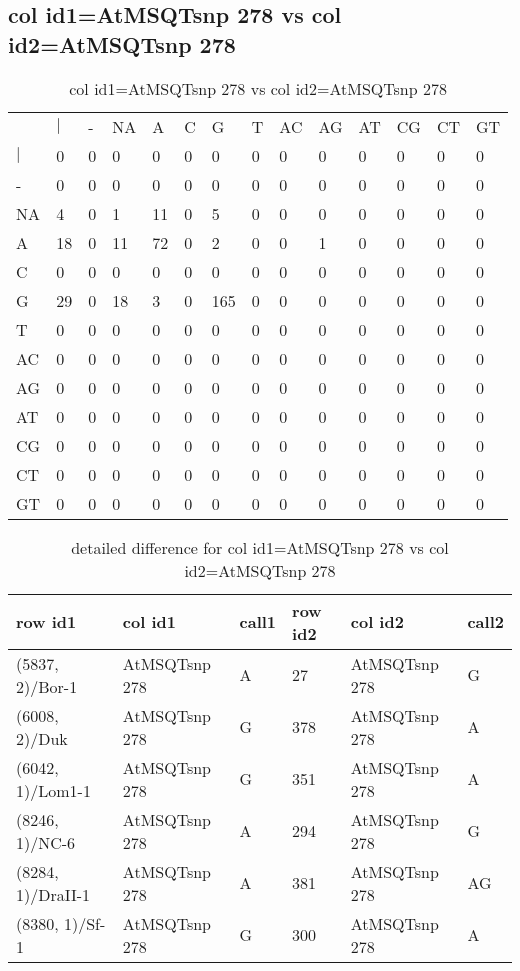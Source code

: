 \subsection{col id1=AtMSQTsnp 278 vs col id2=AtMSQTsnp 278}
\begin{center}
\begin{longtable}{|l|l|l|l|l|l|l|l|l|l|l|l|l|l|}
\caption{col id1=AtMSQTsnp 278 vs col id2=AtMSQTsnp 278} \label{table_dm812}\\
\hline
\\
\hline
&$|$&-&NA&A&C&G&T&AC&AG&AT&CG&CT&GT\\
$|$&0&0&0&0&0&0&0&0&0&0&0&0&0\\
-&0&0&0&0&0&0&0&0&0&0&0&0&0\\
NA&4&0&1&11&0&5&0&0&0&0&0&0&0\\
A&18&0&11&72&0&2&0&0&1&0&0&0&0\\
C&0&0&0&0&0&0&0&0&0&0&0&0&0\\
G&29&0&18&3&0&165&0&0&0&0&0&0&0\\
T&0&0&0&0&0&0&0&0&0&0&0&0&0\\
AC&0&0&0&0&0&0&0&0&0&0&0&0&0\\
AG&0&0&0&0&0&0&0&0&0&0&0&0&0\\
AT&0&0&0&0&0&0&0&0&0&0&0&0&0\\
CG&0&0&0&0&0&0&0&0&0&0&0&0&0\\
CT&0&0&0&0&0&0&0&0&0&0&0&0&0\\
GT&0&0&0&0&0&0&0&0&0&0&0&0&0\\
\hline
\end{longtable}
\end{center}

\begin{center}
\begin{longtable}{|l|l|l|l|l|l|}
\caption{detailed difference for col id1=AtMSQTsnp 278 vs col id2=AtMSQTsnp 278} \label{table_dm813}\\
\hline
row id1&col id1&call1&row id2&col id2&call2\\
\hline
(5837, 2)/Bor-1&AtMSQTsnp 278&A&27&AtMSQTsnp 278&G\\
(6008, 2)/Duk&AtMSQTsnp 278&G&378&AtMSQTsnp 278&A\\
(6042, 1)/Lom1-1&AtMSQTsnp 278&G&351&AtMSQTsnp 278&A\\
(8246, 1)/NC-6&AtMSQTsnp 278&A&294&AtMSQTsnp 278&G\\
(8284, 1)/DraII-1&AtMSQTsnp 278&A&381&AtMSQTsnp 278&AG\\
(8380, 1)/Sf-1&AtMSQTsnp 278&G&300&AtMSQTsnp 278&A\\
\hline
\end{longtable}
\end{center}

